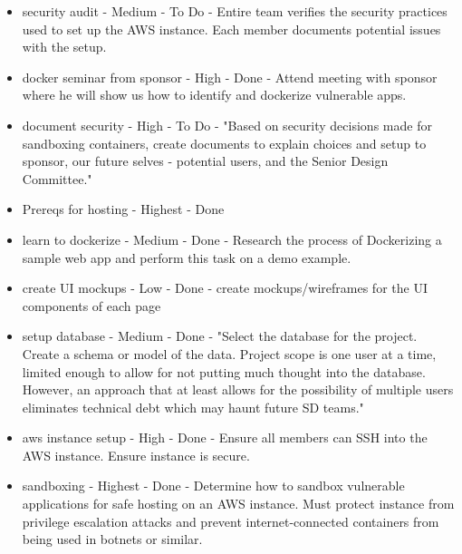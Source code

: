 \documentclass[12pt,titlepage]{article}
\begin{document}
\begin{itemize}
	\item security audit - Medium - To Do - Entire team verifies the security practices used to set up the AWS instance. Each member documents potential issues with the setup.
	\item docker seminar from sponsor - High - Done - Attend meeting with sponsor where he will show us how to identify and dockerize vulnerable apps.
	\item document security - High - To Do - "Based on security decisions made for sandboxing containers, create documents to explain choices and setup to sponsor, our future selves -  potential users, and the Senior Design Committee."
	\item Prereqs for hosting - Highest - Done
	\item learn to dockerize - Medium - Done - Research the process of Dockerizing a sample web app and perform this task on a demo example.
	\item create UI mockups - Low - Done - create mockups/wireframes for the UI components of each page
	\item setup database - Medium - Done - "Select the database for the project. Create a schema or model of the data. Project scope is one user at a time, limited enough to allow for not putting much thought into the database. However, an approach that at least allows for the possibility of multiple users eliminates technical debt which may haunt future SD teams."
	\item aws instance setup - High - Done - Ensure all members can SSH into the AWS instance. Ensure instance is secure.
	\item sandboxing - Highest - Done - Determine how to sandbox vulnerable applications for safe hosting on an AWS instance. Must protect instance from privilege escalation attacks and prevent internet-connected containers from being used in botnets or similar.
\end{itemize}
\end{document}
